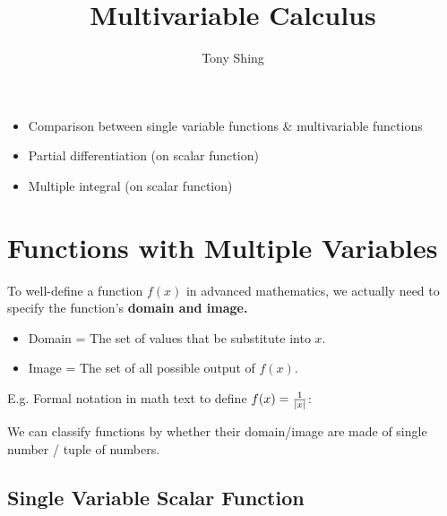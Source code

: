 \documentclass[class=article, crop=false, 12pt]{standalone}
\author{Tony Shing}
\title{Multivariable Calculus}
\begin{document}
\maketitle


\begin{overview}
    \begin{itemize}
        \item Comparison between single variable functions \& multivariable functions
        \item Partial differentiation (on scalar function)
        \item Multiple integral (on scalar function)
    \end{itemize}
\end{overview}



\section{Functions with Multiple Variables}

To well-define a function $f(x)$ in advanced mathematics,
we actually need to specify the function's \bf{domain} and \bf{image}.\\

\begin{itemize}
    \item Domain = The set of values that be substitute into $x$.
    \item Image = The set of all possible output of $f(x)$. 
\end{itemize}

E.g. Formal notation in math text to define $f(x) = \frac{1}{|x|}$:

We can classify functions by whether their domain/image are made of single number / tuple of numbers.



\subsection{Single Variable Scalar Function}
\end{document}
